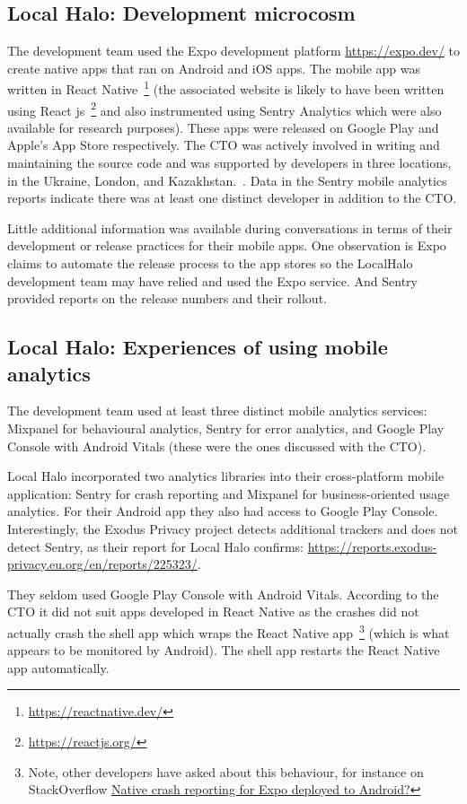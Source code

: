 \subsection{Local Halo: Development microcosm}
The development team used the Expo development platform \url{https://expo.dev/} to create native apps that ran on Android and iOS apps. The mobile app was written in React Native~\footnote{\url{https://reactnative.dev/}} (the associated website is likely to have been written using React js~\footnote{\url{https://reactjs.org/}} and also instrumented using Sentry Analytics which were also available for research purposes). These apps were released on Google Play and Apple's App Store respectively. The CTO was actively involved in writing and maintaining the source code and was supported by developers in three locations, in the Ukraine, London, and Kazakhstan.~\citep{karpenko2019_localhalo_a_social_network_for_neighbors}.  Data in the Sentry mobile analytics reports indicate there was at least one distinct developer in addition to the CTO.

Little additional information was available during conversations in terms of their development or release practices for their mobile apps. One observation is Expo claims to automate the release process to the app stores so the LocalHalo development team may have relied and used the Expo service. And Sentry provided reports on the release numbers and their rollout.

\subsection{Local Halo: Experiences of using mobile analytics}
The development team used at least three distinct mobile analytics services: Mixpanel for behavioural analytics, Sentry for error analytics, and Google Play Console with Android Vitals (these were the ones discussed with the CTO). 

Local Halo incorporated two analytics libraries into their cross-platform mobile application: Sentry for crash reporting and Mixpanel for business-oriented usage analytics. For their Android app they also had access to Google Play Console. Interestingly, the Exodus Privacy project detects additional trackers and does not detect Sentry, as their report for Local Halo confirms: \url{https://reports.exodus-privacy.eu.org/en/reports/225323/}.

They seldom used Google Play Console with Android Vitals. According to the CTO it did not suit apps developed in React Native as the crashes did not actually crash the shell app which wraps the React Native app~\footnote{Note, other developers have asked about this behaviour, for instance on StackOverflow \href{https://stackoverflow.com/questions/66166824/native-crash-reporting-for-expo-deployed-to-android/}{Native crash reporting for Expo deployed to Android?}} 
(which is what appears to be monitored by Android). The shell app restarts the React Native app automatically.

